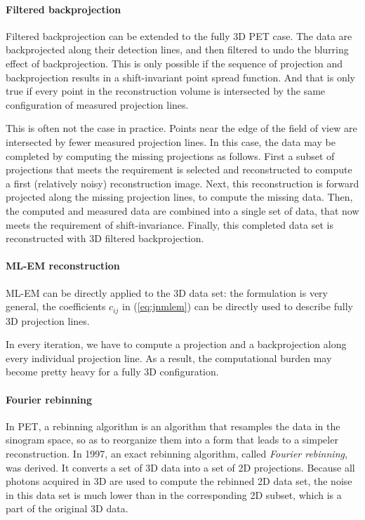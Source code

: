 \documentclass[11pt,oneside]{article}
\begin{document}
\paragraph{Filtered backprojection}
Filtered backprojection can be extended to the fully 3D PET case. The data are
backprojected along their detection lines, and then filtered to undo the
blurring effect of backprojection. This is only possible if the sequence of
projection and backprojection results in a shift-invariant point spread
function. And that is only true if every point in the reconstruction volume is
intersected by the same configuration of measured projection lines.

This is often not the case in practice. Points near the edge of the field of
view are intersected by fewer measured projection lines. In this case, the
data may be completed by computing the missing projections as follows. First a
subset of projections that meets the requirement is selected and reconstructed
to compute a first (relatively noisy) reconstruction image. Next, this
reconstruction is forward projected along the missing projection lines, to
compute the missing data. Then, the computed and measured data are combined
into a single set of data, that now meets the requirement of shift-invariance.
Finally, this completed data set is reconstructed with 3D filtered
backprojection.

\paragraph{ML-EM reconstruction}
ML-EM can be directly applied to the 3D data set: the formulation is very
general, the coefficients $c_{ij}$ in (\ref{eq:jnmlem}) can be directly used
to describe fully 3D projection lines.

In every iteration, we have to compute a projection and a backprojection along
every individual projection line. As a result, the computational burden may
become pretty heavy for a fully 3D configuration.


\paragraph{Fourier rebinning}
In PET, a rebinning algorithm is an algorithm that resamples the data
in the sinogram space, so as to reorganize them into a form that
leads to a simpeler reconstruction.
%
In 1997, an exact rebinning algorithm, called {\em Fourier rebinning},
was derived. It converts a set of 3D data into a set of 2D
projections. Because all photons acquired in 3D are used to compute
the rebinned 2D data set, the noise in this data set is much lower
than in the corresponding 2D subset, which is a part of the original
3D data.
\end{document}
